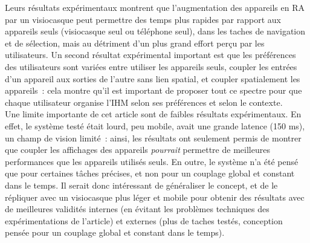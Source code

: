 Leurs résultats expérimentaux montrent que l'augmentation des appareils en RA par un visiocasque peut permettre des temps plus rapides par rapport aux appareils seuls (visiocasque seul ou téléphone seul), dans les taches de navigation et de sélection, mais au détriment d'un plus grand effort perçu par les utilisateurs. Un second résultat expérimental important est que les préférences des utilisateurs sont variées entre utiliser les appareils seuls, coupler les entrées d'un appareil aux sorties de l'autre sans lien spatial, et coupler spatialement les appareils~: cela montre qu'il est important de proposer tout ce spectre pour que chaque utilisateur organise l'IHM selon ses préférences et selon le contexte.\\
Une limite importante de cet article sont de faibles résultats expérimentaux. En effet, le système testé était lourd, peu mobile, avait une grande latence (150 ms), un champ de vision limité~: ainsi, les résultats ont seulement permis de montrer que coupler les affichages des appareils \emph{pourrait} permettre de meilleures performances que les appareils utilisés seuls. En outre, le système n'a été pensé que pour certaines tâches précises, et non pour un couplage global et constant dans le temps. Il serait donc intéressant de généraliser le concept, et de le répliquer avec un visiocasque plus léger et mobile pour obtenir des résultats avec de meilleures validités internes (en évitant les problèmes techniques des expérimentations de l'article) et externes (plus de taches testés, conception pensée pour un couplage global et constant dans le temps).


